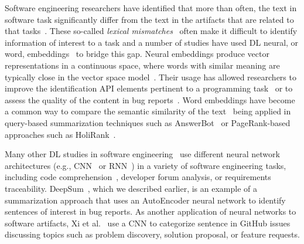 Software engineering researchers have identified that more than often, the text 
in software task 
significantly differ from the text in the artifacts that are related to that tasks~\cite{Huang2018}. 
These so-called \textit{lexical mismatches}~\cite{Ye2016} 
often make it difficult to identify information of interest 
to a task and a number of studies have used \acs{DL}
neural, or word,
embeddings~\cite{Mikolov2013} to bridge this gap. 
Neural embeddings produce vector representations in a continuous space,
where words with similar meaning are typically close in the vector space model~\cite{harris1954distributional, mikolov2013efficient}. 
Their usage has allowed researchers to improve 
the identification API elements pertinent to a programming task~\cite{Ye2016} 
or to assess the quality of the content in bug reports~\cite{chaparro2019}.
Word embeddings have become a common way 
to compare the semantic similarity of the text~\cite{mihalcea2006}
being applied in query-based summarization techniques such as 
AnswerBot~\cite{Xu2017}
or PageRank-based approaches such as HoliRank~\cite{Ponzanelli2017}.



Many other \acs{DL} studies in software engineering~\cite{watson2022}
use different neural network architectures (e.g., CNN~\cite{} or RNN~\cite{})
in a variety of software engineering tasks, including
code comprehension~\cite{}, developer forum analysis, or requirements traceability.
DeepSum~\cite{Li2018}, which we described earlier, is an example of a 
summarization approach that uses an AutoEncoder neural network to identify 
sentences of interest in bug reports. As another application of neural networks
to software artifacts, Xi et al.~\cite{Xia2017} use a CNN 
to categorize sentence in GitHub issues discussing topics such as 
problem discovery, solution proposal, or feature requests.













